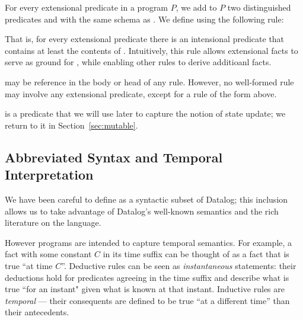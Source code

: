 For every extensional predicate  in a \slang program $P$, we add to
$P$ two distinguished predicates  and  with the same schema
as .  We define  using the following rule:


That is, for every extensional predicate  there is an intensional
predicate  that contains at least the contents of .
Intuitively, this rule allows extensional facts to serve as ground for
, while enabling other rules to derive additioanl  facts.

 may be reference in the body or head of any \slang rule.  However, no well-formed \slang rule may involve any extensional predicate, except for a rule of the form above.

 is a predicate that we will use later to capture the notion of state update; we return to it in Section~\ref{sec:mutable}. 



\subsection{Abbreviated Syntax and Temporal Interpretation}
\label{sec:abbrvsyntax}

We have been careful to define \slang as a syntactic subset of Datalog; this inclusion allows us to take advantage of Datalog's
well-known semantics and the rich literature on the language.

However \slang programs are intended to capture 
temporal semantics.  For example, a fact with some constant $C$ in its time
suffix can be thought of as a fact that is true ``at time $C$''.  
Deductive rules can be seen as {\em instantaneous} statements: their deductions hold for 
predicates agreeing in the time suffix and describe what is true ``for an instant" given 
what is known at that instant.
 Inductive %
 rules are {\em temporal} --- their consequents are defined to
be true ``at a different time'' than their antecedents. 



